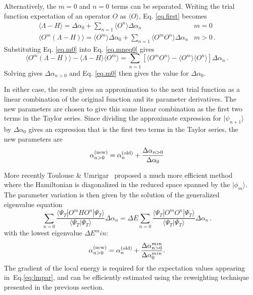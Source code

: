 Alternatively, the $m=0$ and $n=0$ terms can be separated. Writing
the trial function expectation of an operator $O$ as $\langle O\rangle$,
Eq. \ref{eq.first} becomes
\begin{eqnarray}
\label{eq.m0}
\langle \Lambda - H \rangle = \Delta \alpha_0 + \sum_{n=1} \langle O^n\rangle
\Delta \alpha_n & m=0\\
\label{eq.mneq0}
\langle O^m (\Lambda-H) \rangle = \langle O^m\rangle \Delta \alpha_0
+ \sum_{n=1} \langle O^m O^n\rangle \Delta \alpha_n & m > 0 \,.
\end{eqnarray}
Substituting Eq. \ref{eq.m0} into Eq. \ref{eq.mneq0} gives
\begin{equation}
\label{eq:srpar}
\langle O^m(\Lambda - H) \rangle -\langle \Lambda - H\rangle \langle O^m\rangle
= \sum_{n=1} \left [ \langle O^mO^n\rangle - \langle O^m\rangle
\langle O^n\rangle \right ] \Delta \alpha_n \,.
\end{equation}
Solving gives $\Delta \alpha_{n>0}$ and
Eq. \ref{eq.m0} then gives the value for $\Delta \alpha_0$.

In either case, the result gives an approximation to the next trial
function as a linear combination of the original function and its
parameter derivatives. The new parameters are chosen to give this
same linear combination as the first two terms in the Taylor series.
Since dividing the approximate expression for $|\psi_{n+1}\rangle$
by $\Delta\alpha_0$ gives
an expression that is the first two terms in the Taylor series,
the new parameters are
\begin{equation}
\alpha^{(\rm new)}_{n>0} =
\alpha^{(\rm old)}_n + \frac{\Delta \alpha_{n>0}}{\Delta \alpha_0}
\end{equation}


More recently Toulouse \& Umrigar~\cite{Toulouse07} proposed a much more efficient method
where the Hamiltonian is diagonalized in the reduced space spanned by the $|\phi_m\rangle$.
The parameter variation is then given by the solution of the generalized eigenvalue equation
\begin{equation}
\label{eq:lmpar}
\sum_{n=0}\frac{\langle \Psi_T |O^m H O^n|\Psi_T\rangle}
{\langle \Psi_T |\Psi_T\rangle}\Delta \alpha_n
= \Delta E \sum_{n=0} \frac{\langle \Psi_T |O^m O^n |\Psi_T\rangle}
{\langle \Psi_T |\Psi_T\rangle} \Delta \alpha_n\,.
\end{equation}
with the lowest eigenvalue $\Delta E^min$:
\begin{equation}
\alpha^{(\rm new)}_{n>0} =
\alpha^{(\rm old)}_n + \frac{\Delta \alpha^{min}_{n>0}}{\Delta \alpha^{min}_0} .
\end{equation}
The gradient of the local energy is required for the expectation values 
appearing in~Eq.\eqref{eq:lmpar}, and can be efficiently estimated using the
reweighting technique presented in the previous section.

